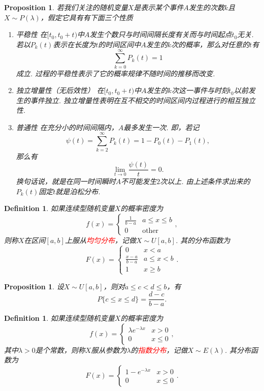 \documentclass{article}
\newtheorem{proposition}[theorem]{Proposition}
\newtheorem{definition}[theorem]{Definition}
\newcommand{\redt}[1]{\textcolor{red}{#1}}
\begin{document}
\begin{proposition}
\rm 若我们关注的随机变量$X$是表示某个事件$A$发生的次数$k$且$X\sim P(\lambda)$，假定它具有有下面三个性质
\begin{enumerate}
	\item {\color{red}平稳性} 在$[t_0,t_0+t)$中$A$发生个数只与时间间隔长度有关而与时间起点$t_0$无关. 若以$P_k(t)$表示在长度为$t$的时间区间中$A$发生的$k$次的概率，那么对任意的$t$有
	$$
	\sum\limits_{k=0}^{\infty} P_k(t) = 1
	$$
	成立. 过程的平稳性表示了它的概率规律不随时间的推移而改变.
	\item {\color{red}独立增量性（无后效性）} 在$[t_0,t_0+t)$中$A$发生的$k$次这一事件与时刻$t_0$以前发生的事件独立. 独立增量性表明在互不相交的时间区间内过程进行的相互独立性.
	\item {\color{red}普通性} 在充分小的时间间隔内，$A$最多发生一次. 即，若记
	$$
	\psi(t) = \sum\limits_{k=2}^{\infty} P_k(t) = 1-P_0(t)-P_1(t),
	$$
	那么有
	$$
	\lim\limits_{t \rightarrow 0} \frac{\psi(t)}{t} = 0.
	$$
	换句话说，就是在同一时间瞬时$A$不可能发生$2$次以上. 由上述条件求出来的$P_k(t)$固定$t$就是泊松分布. 
\end{enumerate}
\end{proposition}

\begin{definition}
\rm 如果连续型随机变量$X$的概率密度为
$$
f(x) = \left\{\begin{array}{ll}
\frac{1}{b-a} & a \leq x \leq b\\
0 & \text{other}
\end{array}\right.,
$$
则称$X$在区间$[a,b]$上服从\redt{均匀分布}，记做$X \sim U[a,b]$. 其的分布函数为
$$
F(x) = \left\{\begin{array}{ll}
0 & x < a \\
\frac{x-a}{b-a} & a \leq x < b\\
1 & x \geq b
\end{array}\right..
$$
\end{definition}

\begin{proposition}
\rm 设$X \sim U[a,b]$，则对$a \leq c < d \leq b$，有
$$
P\{c\leq x \leq d\} = \frac{d-c}{b-a}.
$$
\end{proposition}

\begin{definition}
\rm 如果连续型随机变量$X$的概率密度为
$$
f(x) = \left\{ \begin{array}{ll}
\lambda e^{-\lambda x} & x > 0 \\
0 & x \leq 0
\end{array}\right.,
$$
其中$\lambda > 0$是个常数，则称$X$服从参数为$\lambda$的\redt{指数分布}，记做$X \sim E(\lambda)$. 其分布函数为
$$
F(x) = \left\{\begin{array}{ll}
1 - e^{-\lambda x} & x > 0 \\
0 & x \leq 0
\end{array}\right..
$$
\end{definition}
\end{document}
